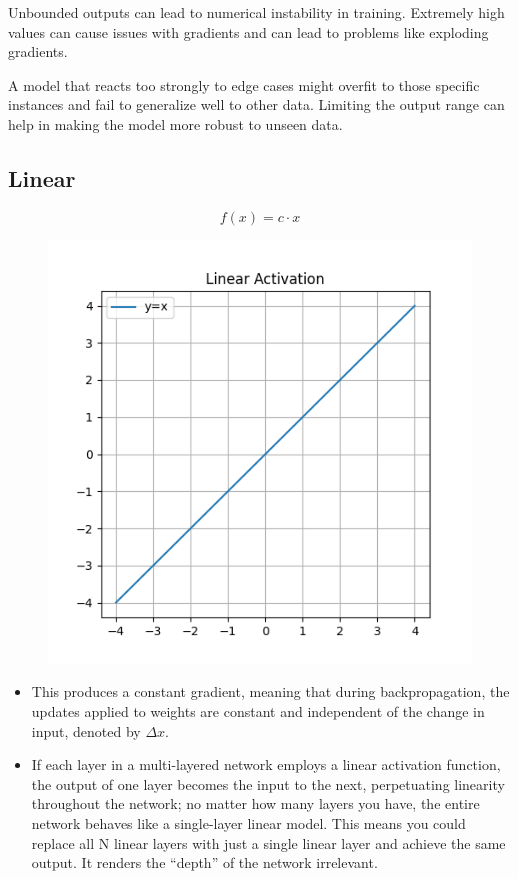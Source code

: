 \documentclass[11pt]{article}
\begin{document}
Unbounded outputs can lead to numerical instability in training. Extremely high values can cause issues with gradients and can lead to problems like exploding gradients.

A model that reacts too strongly to edge cases might overfit to those specific instances and fail to generalize well to other data. Limiting the output range can help in making the model more robust to unseen data.

\subsection{Linear}

\begin{definition}\label{eq:activation-linear}
    \begin{equation*}
        f(x) = c\cdot x
    \end{equation*}
\end{definition}

\begin{figure}[H]
    \centering
    \includegraphics*[width=.4\linewidth]{figures/Linear Activation.png}\label{fig:linear}
\end{figure}

\begin{itemize}
    \item This produces a constant gradient, meaning that during backpropagation, the updates applied to weights are constant and independent of the change in input, denoted by $\Delta x$.
    \item If each layer in a multi-layered network employs a linear activation function, the output of one layer becomes the input to the next, perpetuating linearity throughout the network; no matter how many layers you have, the entire network behaves like a single-layer linear model. This means you could replace all N linear layers with just a single linear layer and achieve the same output. It renders the ``depth'' of the network irrelevant. 
\end{itemize}
\end{document}
